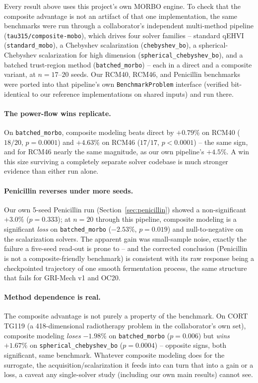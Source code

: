 \documentclass[11pt]{article}
\begin{document}
Every result above uses this project's own MORBO engine. To check that
the composite advantage is not an artifact of that one implementation,
the same benchmarks were run through a collaborator's independent
multi-method pipeline (\texttt{tau315/composite-mobo}), which drives four
solver families -- standard qEHVI (\texttt{standard\_mobo}), a Chebyshev
scalarization (\texttt{chebyshev\_bo}), a spherical-Chebyshev
scalarization for high dimension (\texttt{spherical\_chebyshev\_bo}), and
a batched trust-region method (\texttt{batched\_morbo}) -- each in a
direct and a composite variant, at $n=17$--$20$ seeds. Our RCM40, RCM46,
and Penicillin benchmarks were ported into that pipeline's own
\texttt{BenchmarkProblem} interface (verified bit-identical to our
reference implementations on shared inputs) and run there.

\paragraph{The power-flow wins replicate.} On \texttt{batched\_morbo},
composite modeling beats direct by $+0.79\%$ on RCM40 ($18/20$,
$p=0.0001$) and $+4.63\%$ on RCM46 ($17/17$, $p<0.0001$) -- the same
sign, and for RCM46 nearly the same magnitude, as our own pipeline's
$+4.5\%$. A win this size surviving a completely separate solver
codebase is much stronger evidence than either run alone.

\paragraph{Penicillin reverses under more seeds.} Our own 5-seed
Penicillin run (Section~\ref{sec:penicillin}) showed a non-significant
$+3.0\%$ ($p=0.333$); at $n=20$ through this pipeline, composite modeling
is a significant \emph{loss} on \texttt{batched\_morbo} ($-2.53\%$,
$p=0.019$) and null-to-negative on the scalarization solvers. The
apparent gain was small-sample noise, exactly the failure a
five-seed read-out is prone to -- and the corrected conclusion (Penicillin
is not a composite-friendly benchmark) is consistent with its raw
response being a checkpointed trajectory of one smooth fermentation
process, the same structure that fails for GRI-Mech v1 and OC20.

\paragraph{Method dependence is real.} The composite advantage is not
purely a property of the benchmark. On CORT TG119 (a 418-dimensional
radiotherapy problem in the collaborator's own set), composite modeling
\emph{loses} $-1.98\%$ on \texttt{batched\_morbo} ($p=0.006$) but
\emph{wins} $+1.67\%$ on \texttt{spherical\_chebyshev\_bo} ($p=0.0004$)
-- opposite signs, both significant, same benchmark. Whatever composite
modeling does for the surrogate, the acquisition/scalarization it feeds
into can turn that into a gain or a loss, a caveat any single-solver
study (including our own main results) cannot see.
\end{document}
